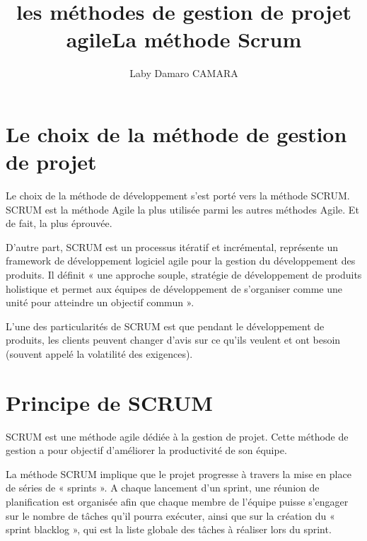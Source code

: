 \documentclass{article}           %
\title{ les m\'ethodes de gestion de projet agile}     %
\author{Laby Damaro CAMARA}        %
\begin{document}
\maketitle                        %
\title{La m\'ethode Scrum}
\newpage
\tableofcontents                  %
\section{Le choix de la m\'ethode de gestion de projet}
Le choix de la m\'ethode de d\'eveloppement s’est port\'e vers la m\'ethode SCRUM.
SCRUM est la m\'ethode Agile la plus utilis\'ee parmi les autres m\'ethodes Agile. Et de fait, la
plus \'eprouv\'ee.

D’autre part, SCRUM est un processus it\'eratif et incr\'emental, repr\'esente un framework
de d\'eveloppement logiciel agile pour la gestion du d\'eveloppement des produits.
Il d\'efinit « une approche souple, strat\'egie de d\'eveloppement de produits holistique et permet
aux \'equipes de d\'eveloppement de s'organiser comme une unit\'e pour atteindre un objectif
commun ».

L’une des particularit\'es de SCRUM est que pendant le d\'eveloppement de produits, les clients
peuvent changer d'avis sur ce qu'ils veulent et ont besoin (souvent appel\'e la volatilit\'e des
exigences).

\section{Principe de SCRUM}
SCRUM est une m\'ethode agile d\'edi\'ee à la gestion de projet. Cette m\'ethode de gestion a pour
objectif d’am\'eliorer la productivit\'e de son \'equipe.

La m\'ethode SCRUM implique que le projet progresse à travers la mise en place de s\'eries de «
sprints ». A chaque lancement d’un sprint, une r\'eunion de planification est organis\'ee afin que
chaque membre de l’\'equipe puisse s’engager sur le nombre de tâches qu’il pourra ex\'ecuter,
ainsi que sur la cr\'eation du « sprint blacklog », qui est la liste globale des tâches à r\'ealiser lors
du sprint.
\end{document}
